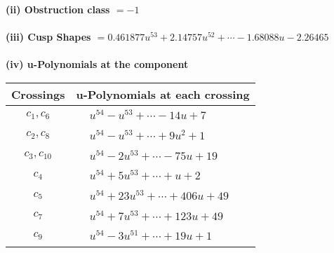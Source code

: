 \documentclass[1p]{elsarticle_modified}
\theoremstyle{definition}
\begin{document}
\flushleft \textbf{(ii) Obstruction class $= -1$}\\~\\
\flushleft \textbf{(iii) Cusp Shapes $= 0.461877 u^{53}+2.14757 u^{52}+\cdots-1.68088 u-2.26465$}\\~\\
\newpage\renewcommand{\arraystretch}{1}
\flushleft \textbf{(iv) u-Polynomials at the component}\newline \\
\begin{tabular}{m{50pt}|m{274pt}}
Crossings & \hspace{64pt}u-Polynomials at each crossing \\
\hline $$\begin{aligned}c_{1},c_{6}\end{aligned}$$&$\begin{aligned}
&u^{54}- u^{53}+\cdots-14 u+7
\end{aligned}$\\
\hline $$\begin{aligned}c_{2},c_{8}\end{aligned}$$&$\begin{aligned}
&u^{54}- u^{53}+\cdots+9 u^2+1
\end{aligned}$\\
\hline $$\begin{aligned}c_{3},c_{10}\end{aligned}$$&$\begin{aligned}
&u^{54}-2 u^{53}+\cdots-75 u+19
\end{aligned}$\\
\hline $$\begin{aligned}c_{4}\end{aligned}$$&$\begin{aligned}
&u^{54}+5 u^{53}+\cdots+u+2
\end{aligned}$\\
\hline $$\begin{aligned}c_{5}\end{aligned}$$&$\begin{aligned}
&u^{54}+23 u^{53}+\cdots+406 u+49
\end{aligned}$\\
\hline $$\begin{aligned}c_{7}\end{aligned}$$&$\begin{aligned}
&u^{54}+7 u^{53}+\cdots+123 u+49
\end{aligned}$\\
\hline $$\begin{aligned}c_{9}\end{aligned}$$&$\begin{aligned}
&u^{54}-3 u^{51}+\cdots+19 u+1
\end{aligned}$\\
\hline
\end{tabular}\\~\\
\end{document}
